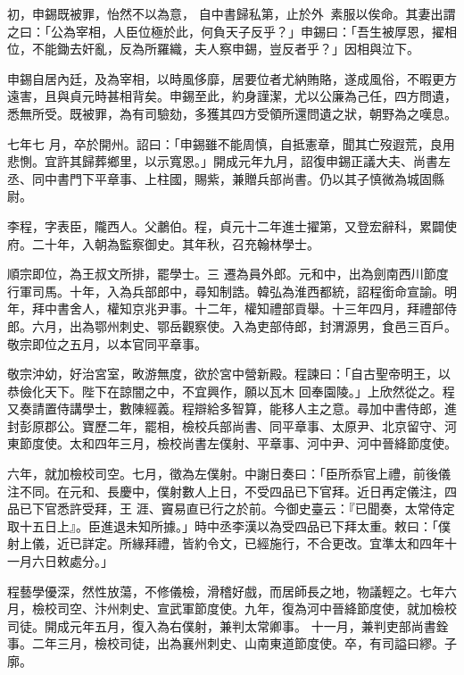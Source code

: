 \begin{pinyinscope}
 初，申錫既被罪，怡然不以為意，
 自中書歸私第，止於外，素服以俟命。其妻出謂之曰：「公為宰相，人臣位極於此，何負天子反乎？」申錫曰：「吾生被厚恩，擢相位，不能鋤去奸亂，反為所羅織，夫人察申錫，豈反者乎？」因相與泣下。



 申錫自居內廷，及為宰相，以時風侈靡，居要位者尤納賄賂，遂成風俗，不暇更方遠害，且與貞元時甚相背矣。申錫至此，約身謹潔，尤以公廉為己任，四方問遺，悉無所受。既被罪，為有司驗劾，多獲其四方受領所還問遺之狀，朝野為之嘆息。



 七年七
 月，卒於開州。詔曰：「申錫雖不能周慎，自抵憲章，聞其亡歿遐荒，良用悲惻。宜許其歸葬鄉里，以示寬恩。」開成元年九月，詔復申錫正議大夫、尚書左丞、同中書門下平章事、上柱國，賜紫，兼贈兵部尚書。仍以其子慎微為城固縣尉。



 李程，字表臣，隴西人。父鷫伯。程，貞元十二年進士擢第，又登宏辭科，累闢使府。二十年，入朝為監察御史。其年秋，召充翰林學士。



 順宗即位，為王叔文所排，罷學士。三
 遷為員外郎。元和中，出為劍南西川節度行軍司馬。十年，入為兵部郎中，尋知制誥。韓弘為淮西都統，詔程銜命宣諭。明年，拜中書舍人，權知京兆尹事。十二年，權知禮部貢舉。十三年四月，拜禮部侍郎。六月，出為鄂州刺史、鄂岳觀察使。入為吏部侍郎，封渭源男，食邑三百戶。敬宗即位之五月，以本官同平章事。



 敬宗沖幼，好治宮室，畋游無度，欲於宮中營新殿。程諫曰：「自古聖帝明王，以恭儉化天下。陛下在諒闇之中，不宜興作，願以瓦木
 回奉園陵。」上欣然從之。程又奏請置侍講學士，數陳經義。程辯給多智算，能移人主之意。尋加中書侍郎，進封彭原郡公。寶歷二年，罷相，檢校兵部尚書、同平章事、太原尹、北京留守、河東節度使。太和四年三月，檢校尚書左僕射、平章事、河中尹、河中晉絳節度使。



 六年，就加檢校司空。七月，徵為左僕射。中謝日奏曰：「臣所忝官上禮，前後儀注不同。在元和、長慶中，僕射數人上日，不受四品已下官拜。近日再定儀注，四品已下官悉許受拜，王
 涯、竇易直已行之於前。今御史臺云：『已聞奏，太常侍定取十五日上』。臣進退未知所據。」時中丞李漢以為受四品已下拜太重。敕曰：「僕射上儀，近已詳定。所緣拜禮，皆約令文，已經施行，不合更改。宜準太和四年十一月六日敕處分。」



 程藝學優深，然性放蕩，不修儀檢，滑稽好戲，而居師長之地，物議輕之。七年六月，檢校司空、汴州刺史、宣武軍節度使。九年，復為河中晉絳節度使，就加檢校司徒。開成元年五月，復入為右僕射，兼判太常卿事。
 十一月，兼判吏部尚書銓事。二年三月，檢校司徒，出為襄州刺史、山南東道節度使。卒，有司謚曰繆。子廓。




\end{pinyinscope}
